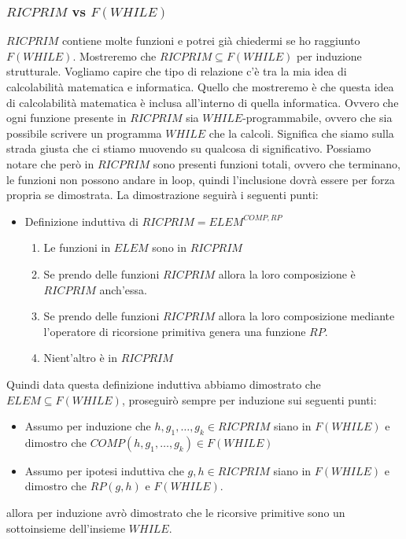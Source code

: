 \documentclass{article}
\begin{document}
\subsubsection{$RICPRIM$ vs $F(WHILE)$}
$RICPRIM$ contiene molte funzioni e potrei già chiedermi se ho raggiunto $F(WHILE)$. Mostreremo
che $RICPRIM\subseteq F(WHILE)$ per induzione strutturale. Vogliamo capire che tipo di relazione
c'è tra la mia idea di calcolabilità matematica e informatica. Quello che mostreremo
è che questa idea di calcolabilità matematica è inclusa all'interno di quella informatica.
\newline\newline
Ovvero che ogni funzione presente in $RICPRIM$ sia $WHILE$-programmabile, ovvero che sia
possibile scrivere un programma $WHILE$ che la calcoli. Significa che siamo sulla strada
giusta che ci stiamo muovendo su qualcosa di significativo.
\newline\newline
Possiamo notare che però in $RICPRIM$ sono presenti funzioni totali, ovvero che terminano,
le funzioni non possono andare in loop, quindi l'inclusione dovrà essere per forza propria
se dimostrata.
La dimostrazione seguirà i seguenti punti:
\begin{itemize}
    \item Definizione induttiva di $RICPRIM=ELEM^{COMP,RP}$
          \begin{enumerate}
              \item Le funzioni in $ELEM$ sono in $RICPRIM$
              \item Se prendo delle funzioni $RICPRIM$ allora la loro composizione è
                    $RICPRIM$ anch'essa.
              \item Se prendo delle funzioni $RICPRIM$ allora la loro composizione mediante l'operatore
                    di ricorsione primitiva genera una funzione $RP$.
              \item Nient'altro è in $RICPRIM$
          \end{enumerate}
\end{itemize}
Quindi data questa definizione induttiva abbiamo dimostrato che $ELEM\subseteq F(WHILE)$,
proseguirò sempre per induzione sui seguenti punti:
\begin{itemize}
    \item Assumo per induzione che $h,g_1,\dots,g_k\in RICPRIM$ siano in $F(WHILE)$
          e dimostro che $COMP(h,g_1,\dots,g_k)\in F(WHILE)$
    \item Assumo per ipotesi induttiva che $g,h\in RICPRIM$ siano in $F(WHILE)$
          e dimostro che $RP(g,h)$ e $F(WHILE)$.
\end{itemize}
allora per induzione avrò dimostrato che le ricorsive primitive sono un sottoinsieme
dell'insieme $WHILE$.
\end{document}
